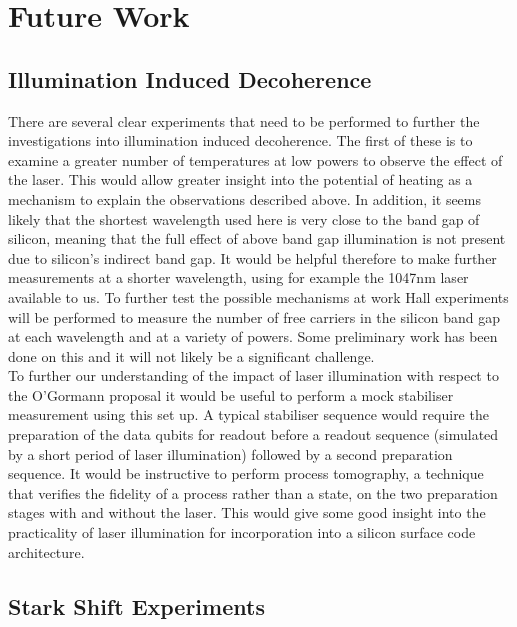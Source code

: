 \chapter{Future Work}


\section{Illumination Induced Decoherence}

There are several clear experiments that need to be performed to further the investigations into illumination induced decoherence.
The first of these is to examine a greater number of temperatures at low powers to observe the effect of the laser.
This would allow greater insight into the potential of heating as a mechanism to explain the observations described above.
In addition, it seems likely that the shortest wavelength used here is very close to the band gap of silicon, meaning that the full effect of above band gap illumination is not present due to silicon's indirect band gap.
It would be helpful therefore to make further measurements at a shorter wavelength, using for example the 1047nm laser available to us.
To further test the possible mechanisms at work Hall experiments will be performed to measure the number of free carriers in the silicon band gap at each wavelength and at a variety of powers.
Some preliminary work has been done on this and it will not likely be a significant challenge.
\\
To further our understanding of the impact of laser illumination with respect to the O'Gormann proposal it would be useful to perform a mock stabiliser measurement using this set up.
A typical stabiliser sequence would require the preparation of the data qubits for readout before a readout sequence (simulated by a short period of laser illumination) followed by a second preparation sequence.
It would be instructive to perform process tomography, a technique that verifies the fidelity of a process rather than a state, on the two preparation stages with and without the laser.
This would give some good insight into the practicality of laser illumination for incorporation into a silicon surface code architecture.

\section{Stark Shift Experiments}

